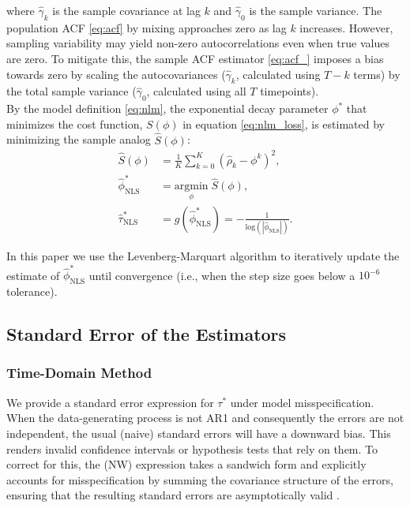\documentclass[docs/main.tex]{subfiles}
\begin{document}
\noindent where $\hat\gamma_k$ is the sample covariance at lag $k$ and $\hat\gamma_0$ is the sample variance. The population ACF \eqref{eq:acf} by mixing approaches zero as lag $k$ increases. However, sampling variability may yield non-zero autocorrelations even when true values are zero. To mitigate this, the sample ACF estimator \eqref{eq:acf_} imposes a bias towards zero by scaling the autocovariances ($\hat \gamma_k$, calculated using $T-k$ terms) by the total sample variance ($\hat\gamma_0$, calculated using all $T$ timepoints). \\

By the model definition \eqref{eq:nlm}, the exponential decay parameter $\phi^*$ that minimizes the cost function, $S(\phi)$ in equation \eqref{eq:nlm_loss}, is estimated by minimizing the sample analog $\widehat{S}(\phi)$:
\begin{align}
    \widehat{S}(\phi) &= \frac{1}{K} \sum_{k=0}^K (\hat\rho_k - \phi^k)^2, \label{eq:nls_loss_}\\
    \hat \phi^*_{\scriptscriptstyle\text{NLS}} &= \underset{\phi}{\text{argmin}} \; \widehat{S}(\phi), \label{eq:nls_phi_}\\
    \hat \tau^*_{\scriptscriptstyle\text{NLS}} &= g(\hat \phi^*_{\scriptscriptstyle\text{NLS}}) = -\frac{1}{\text{log}(|\hat\phi_{\scriptscriptstyle\text{NLS}}|)}.
\end{align}

\noindent In this paper we use the Levenberg-Marquart algorithm to iteratively update the estimate of $\hat \phi^*_{\scriptscriptstyle\text{NLS}}$ until convergence (i.e., when the step size goes below a $10^{-6}$ tolerance).\\

\subsection{Standard Error of the Estimators}
\subsubsection{Time-Domain Method}\label{sec:stderr-time-domain}
We provide a standard error expression for $\tau^*$ under model misspecification. When the data-generating process is not AR1 and consequently the errors are not independent, the usual (naive) standard errors will have a downward bias. This renders invalid confidence intervals or hypothesis tests that rely on them. To correct for this, the \citet{newey_simple_1987} (NW) expression takes a sandwich form and explicitly accounts for misspecification by summing the covariance structure of the errors, ensuring that the resulting standard errors are asymptotically valid \citep[Theorem 14.32]{hansen_econometrics_2022}.\\
\end{document}
